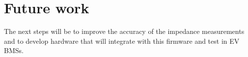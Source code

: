\chapter{Future work}
The next steps will be to improve the accuracy of the impedance measurements and to develop hardware that will integrate with this firmware and test in EV BMSs.